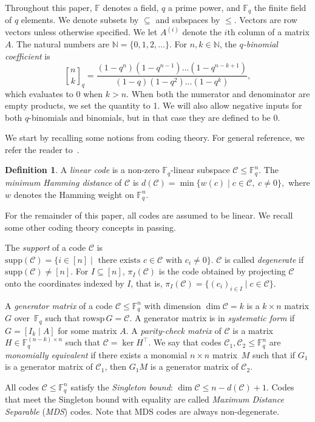 \documentclass[a4paper,11pt,reqno]{article}
\newcommand{\F}{\mathbb{F}}
\newcommand{\supp}{\mathrm{supp}}
\newcommand{\C}{\mathcal{C}}
\newcommand{\rowsp}{\mathrm{rowsp}}
\newcommand{\NN}{\mathbb N}
\newcommand{\qbinom}[2]{\genfrac[]{0pt}{0}{#1}{#2}}
\theoremstyle{plain} \numberwithin{equation}{section}
\theoremstyle{definition}
\newtheorem{definition}[theorem]{Definition}
\begin{document}
Throughout this paper, $\F$ denotes a field, $q$ a prime power, and $\F_q$ the finite field of $q$ elements. We denote subsets by $\subseteq$ and subspaces by $\leq$. Vectors are row vectors unless otherwise specified. 
We let $A^{(i)}$ denote the $i$th column
of a matrix $A$. The natural numbers are  $\NN = \{0,1,2,\ldots\}$. For $n,k\in \NN$, the \emph{$q$-binomial coefficient} is
\[
\qbinom{n}{k}_q = \frac{(1-q^n)(1-q^{n-1})\ldots(1-q^{n-k+1})}{(1-q)(1-q^2)\ldots(1-q^k)},
\]
which evaluates to 0 when $k>n$. When both the numerator and denominator are empty products, we set the quantity to 1. We will also allow negative inputs for both $q$-binomials and binomials, but in that case they are defined to be 0.


We start by recalling some notions from coding theory. For  general reference, we refer the reader to~\cite{vanLint}. \\

\begin{definition} A \emph{linear code} is a non-zero $\F_q$-linear subspace $\C\leq \F_q^n$. The \emph{minimum Hamming distance} of $\C$ is 
$d(\C) = \min\{ w(c) \mid c\in \C, \; c\neq 0\},$
where $w$ denotes the Hamming weight on $\F_q^n$.
\end{definition}

For the remainder of this paper, all codes are assumed to be linear. We recall some other coding theory concepts in passing.

The \emph{support} of a code $\C$ is $\supp(\C) = \{ i\in [n] \mid \text{ there exists } c\in \C \text{ with } c_i \neq 0\}.$ $\C$ is called \emph{degenerate} if $\supp (\C) \neq [n]$. For $I\subseteq [n]$, $\pi_I(\C)$ is the code obtained by projecting $\C$ onto the coordinates indexed by $I$, that is, $\pi_I(\C) = \{(c_i)_{i\in I}\mid c\in \C\}$.

A \emph{generator matrix} of a code $\C\leq \F_q^n$ with dimension $\dim \C = k$ is a $k\times n$ matrix $G$ over~$\F_q$ such that $\rowsp \,G = \C$. A generator matrix is in \emph{systematic form} if $G=[I_k \mid A]$ for some matrix $A$. A \emph{parity-check matrix} of $\C$ is a matrix $H\in \F_q^{(n-k)\times n}$ such that $\C = \ker H^\top$. We say that codes $\C_1,\C_2\leq \F_q^n$ are \emph{monomially equivalent} if there exists a monomial $n\times n$ matrix~$M$ such that if $G_1$ is a generator matrix of $\C_1$, then $G_1M$ is a generator matrix of $\C_2$.

All codes $\C\leq \F_q^n$ satisfy the \emph{Singleton bound}: $\dim\C \leq n - d(\C) +1$. Codes that meet the Singleton bound with equality are called \textit{Maximum Distance Separable} (\textit{MDS}) codes. Note that MDS codes are always non-degenerate.
\end{document}

